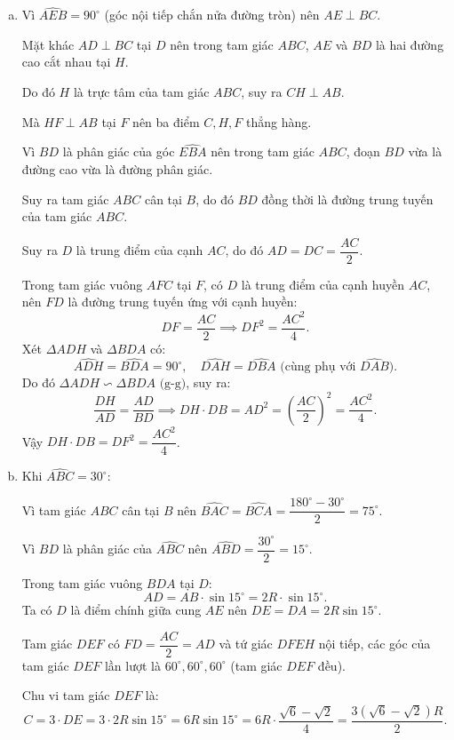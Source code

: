 \begin{bt}
{\begin{enumerate}[a)]
			Do đó $AD \perp BD \implies \widehat{HDA} = 90^\circ$.
			
			Vì $HF \perp AB$ tại $F$ nên $\widehat{HFA} = 90^\circ$.
			
			Tứ giác $AFHD$ có $\widehat{HDA} = \widehat{HFA} = 90^\circ$, do đó hai đỉnh kề nhau $D$ và $F$ cùng nhìn đoạn $AH$ dưới một góc vuông.
			
			Suy ra tứ giác $AFHD$ nội tiếp đường tròn đường kính $AH$.
			
			Do đó $\widehat{HFD} = \widehat{HAD}$ (hai góc nội tiếp cùng chắn cung $HD$).
			\item Vì $\widehat{AEB} = 90^\circ$ (góc nội tiếp chắn nửa đường tròn) nên $AE \perp BC$.
			
			Mặt khác $AD \perp BC$ tại $D$ nên trong tam giác $ABC$, $AE$ và $BD$ là hai đường cao cắt nhau tại $H$.
			
			Do đó $H$ là trực tâm của tam giác $ABC$, suy ra $CH \perp AB$.
			
			Mà $HF \perp AB$ tại $F$ nên ba điểm $C, H, F$ thẳng hàng.
			
			Vì $BD$ là phân giác của góc $\widehat{EBA}$ nên trong tam giác $ABC$, đoạn $BD$ vừa là đường cao vừa là đường phân giác.
			
			Suy ra tam giác $ABC$ cân tại $B$, do đó $BD$ đồng thời là đường trung tuyến của tam giác $ABC$.
			
			Suy ra $D$ là trung điểm của cạnh $AC$, do đó $AD = DC = \dfrac{AC}{2}$.
			
			Trong tam giác vuông $AFC$ tại $F$, có $D$ là trung điểm của cạnh huyền $AC$, nên $FD$ là đường trung tuyến ứng với cạnh huyền:
			$$DF = \dfrac{AC}{2} \implies DF^2 = \dfrac{AC^2}{4}.$$
			Xét $\Delta ADH$ và $\Delta BDA$ có:
			$$\widehat{ADH} = \widehat{BDA} = 90^\circ,\quad \widehat{DAH} = \widehat{DBA}\text{ (cùng phụ với }\widehat{DAB}).$$
			Do đó $\Delta ADH \backsim \Delta BDA\text{ (g-g)}$, suy ra:
			$$\dfrac{DH}{AD} = \dfrac{AD}{BD} \implies DH \cdot DB = AD^2 = \left(\dfrac{AC}{2}\right)^2 = \dfrac{AC^2}{4}.$$
			Vậy $DH \cdot DB = DF^2 = \dfrac{AC^2}{4}$.
			\item Khi $\widehat{ABC} = 30^\circ$:
			
			Vì tam giác $ABC$ cân tại $B$ nên $\widehat{BAC} = \widehat{BCA} = \dfrac{180^\circ - 30^\circ}{2} = 75^\circ$.
			
			Vì $BD$ là phân giác của $\widehat{ABC}$ nên $\widehat{ABD} = \dfrac{30^\circ}{2} = 15^\circ$.
			
			Trong tam giác vuông $BDA$ tại $D$:
			$$AD = AB \cdot \sin 15^\circ = 2R \cdot \sin 15^\circ.$$
			Ta có $D$ là điểm chính giữa cung $AE$ nên $DE = DA = 2R\sin 15^\circ$.
			
			Tam giác $DEF$ có $FD = \dfrac{AC}{2} = AD$ và tứ giác $DFEH$ nội tiếp, các góc của tam giác $DEF$ lần lượt là $60^\circ, 60^\circ, 60^\circ$ (tam giác $DEF$ đều).
			
			Chu vi tam giác $DEF$ là:
			$$C = 3 \cdot DE = 3 \cdot 2R\sin 15^\circ = 6R\sin 15^\circ = 6R \cdot \dfrac{\sqrt{6} - \sqrt{2}}{4} = \dfrac{3(\sqrt{6} - \sqrt{2})R}{2}.$$
		\end{enumerate}
	}
\end{bt}
